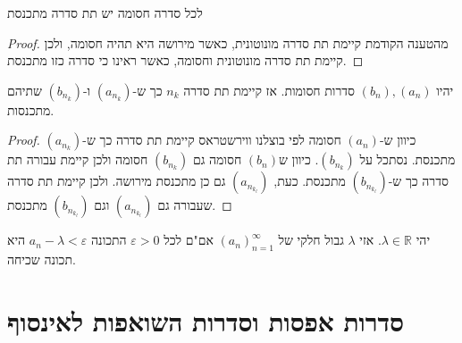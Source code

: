 \documentclass{tstextbook}
\begin{document}
\begin{theorem}
לכל סדרה חסומה יש תת סדרה מתכנסת

\end{theorem}
\begin{proof}
מהטענה הקודמת קיימת תת סדרה מונוטונית, כאשר מירושה היא תהיה חסומה, ולכן קיימת תת סדרה מונוטונית וחסומה, כאשר ראינו כי סדרה כזו מתכנסת.

\end{proof}
\begin{proposition}
יהיו \((b_{n}),(a_{n})\) סדרות חסומות. אז קיימת תת סדרה \(n_{k}\) כך ש-\((a_{n_{k}})\) ו-\((b_{n_{k}})\) שתיהם מתכנסות.

\end{proposition}
\begin{proof}
כיוון ש-\((a_{n})\) חסומה לפי בוצלנו ווירשטראס קיימת תת סדרה כך ש-\((a_{n_{k}})\) מתכנסת. נסתכל על \((b_{n_{k}})\). כיוון ש\((b_{n})\) חסומה גם \((b_{n_{k}})\) חסומה ולכן קיימת עבורה תת סדרה כך ש-\((b_{n_{k_{l}}})\) מתכנסת. כעת, \((a_{n_{k_{l}}})\) גם כן מתכנסת מירושה. ולכן קיימת תת סדרה שעבורה גם \((a_{n_{k_{l}}})\) וגם \((b_{n_{k_{l}}})\) מתכנסת.

\end{proof}
\begin{proposition}
יהי \(\lambda \in \mathbb{R}\). אזי \(\lambda\) גבול חלקי של \((a_n)_{n=1}^\infty\) אם"ם לכל \(\varepsilon>0\) התכונה \(a_{n}-\lambda<\varepsilon\) היא תכונה שכיחה.

\end{proposition}
\section{סדרות אפסות וסדרות השואפות לאינסוף}
\end{document}
